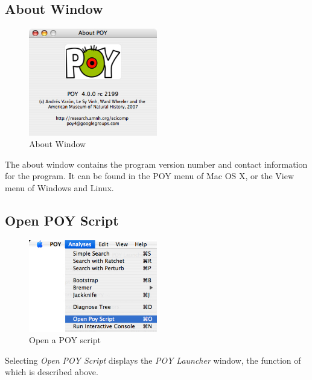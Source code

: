 \subsection{About Window}


\begin{figure}[htpb]
    \begin{center}
        \includegraphics[width=0.5\textwidth]{figures/About_Window.jpg}
    \end{center}
    \caption{About Window}
    \label{fig:about_window}
\end{figure}
The about window contains the program version number and contact information for
the program. It can be found in the POY menu of Mac OS X, or the View menu of
Windows and Linux.

\subsection{Open POY Script}

\begin{figure}[htpb]
    \begin{center}
        \includegraphics[width=0.5\textwidth]{figures/OpenPoyScript_Menu.jpg}
    \end{center}
    \caption{Open a POY script}
    \label{fig:open_poy_script}
\end{figure}
Selecting \emph{Open POY Script} displays the \emph{POY Launcher}
window, the function of which is described above.


